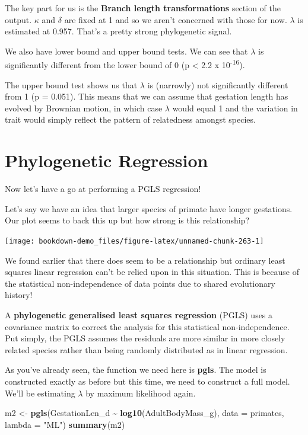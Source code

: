 \documentclass[
]{book}
\newenvironment{Shaded}{\begin{snugshade}}{\end{snugshade}}
\newcommand{\DataTypeTok}[1]{\textcolor[rgb]{0.13,0.29,0.53}{#1}}
\newcommand{\KeywordTok}[1]{\textcolor[rgb]{0.13,0.29,0.53}{\textbf{#1}}}
\newcommand{\NormalTok}[1]{#1}
\newcommand{\OperatorTok}[1]{\textcolor[rgb]{0.81,0.36,0.00}{\textbf{#1}}}
\newcommand{\StringTok}[1]{\textcolor[rgb]{0.31,0.60,0.02}{#1}}
\begin{document}
The key part for us is the \textbf{Branch length transformations} section of the output. \(\kappa\) and \(\delta\) are fixed at 1 and so we aren't concerned with those for now. \(\lambda\) is estimated at 0.957. That's a pretty strong phylogenetic signal.

We also have lower bound and upper bound tests. We can see that \(\lambda\) is significantly different from the lower bound of 0 (p \textless{} 2.2 x 10\textsuperscript{-16}).

The upper bound test shows us that \(\lambda\) is (narrowly) not significantly different from 1 (p = 0.051). This means that we can assume that gestation length has evolved by Brownian motion, in which case \(\lambda\) would equal 1 and the variation in trait would simply reflect the pattern of relatedness amongst species.

\hypertarget{phylogenetic-regression}{%
\section{Phylogenetic Regression}\label{phylogenetic-regression}}

Now let's have a go at performing a PGLS regression!

Let's say we have an idea that larger species of primate have longer gestations. Our plot seems to back this up but how strong is this relationship?

\begin{center}\texttt{[image: bookdown-demo\_files/figure-latex/unnamed-chunk-263-1]} \end{center}

We found earlier that there does seem to be a relationship but ordinary least squares linear regression can't be relied upon in this situation. This is because of the statistical non-independence of data points due to shared evolutionary history!

A \textbf{phylogenetic generalised least squares regression} (PGLS) uses a covariance matrix to correct the analysis for this statistical non-independence. Put simply, the PGLS assumes the residuals are more similar in more closely related species rather than being randomly distributed as in linear regression.

As you've already seen, the function we need here is \textbf{pgls}. The model is constructed exactly as before but this time, we need to construct a full model. We'll be estimating \(\lambda\) by maximum likelihood again.

\begin{Shaded}
\begin{Highlighting}[]
\NormalTok{m2 \textless{}{-}}\StringTok{ }\KeywordTok{pgls}\NormalTok{(GestationLen\_d }\OperatorTok{\textasciitilde{}}\StringTok{ }\KeywordTok{log10}\NormalTok{(AdultBodyMass\_g), }\DataTypeTok{data =}\NormalTok{ primates, }\DataTypeTok{lambda =} \StringTok{"ML"}\NormalTok{)}
\KeywordTok{summary}\NormalTok{(m2)}
\end{Highlighting}
\end{Shaded}
\end{document}
